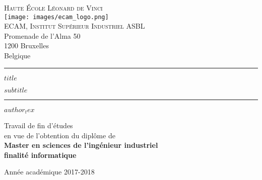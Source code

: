 \documentclass[
    $if(papersize)$
        $papersize$,
    $else$
        a4paper,
    $endif$
    $if(fontsize)$
        $fontsize$,
    $else$
        11pt,
    $endif$
    oneside
]{report}
\begin{document}
    \begin{titlepage}
        \sffamily

        \begin{center}
            \large
            \textsc{Haute École Léonard de Vinci} \\
            \centering
            \texttt{[image: images/ecam\_logo.png]} \\
            \textsc{ECAM, Institut Supérieur Industriel ASBL} \\
            {\small
                Promenade de l'Alma 50 \\
                1200 Bruxelles \\
                Belgique
            }
        \end{center}


        \begin{center}
            \rule{\textwidth}{1pt}
            {\huge\bfseries
                $title$ \par
            }
            \vspace{\baselineskip}
            {\LARGE\bfseries
                $subtitle$
            }
            \rule{\textwidth}{1pt}
        \end{center}


        \begin{center}
            {\Large
                $author_tex$
            }
        \end{center}


        \begin{center}
            {\large
                Travail de fin d'études \\
                en vue de l'obtention du diplôme de \\
                \textbf{
                    Master en sciences de l'ingénieur industriel \\
                    finalité informatique
                }
            }
        \end{center}


        \vfill

        \begin{center}
            {\large
                Année académique 2017-2018
            }
        \end{center}

        \normalfont
        \thispagestyle{empty}
    \end{titlepage}
\end{document}
